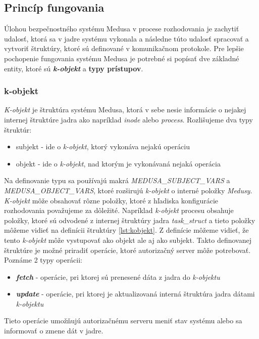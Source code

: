 \subsection{Princíp fungovania}
Úlohou bezpečnostného systému Medusa v procese rozhodovania je zachytiť udalosť, ktorá sa v jadre systému vykonala a následne túto udalosť spracovať a vytvoriť štruktúry, ktoré sú definované v komunikačnom protokole. Pre lepšie pochopenie fungovania systému Medusa je potrebné si popísať dve základné entity, ktoré sú \textbf{\textit{k-objekt}} a \textbf{typy prístupov}.
\subsubsection{k-objekt} \label{kobjekt}
\textit{K-objekt} je štruktúra systému Medusa, ktorá v sebe nesie informácie o nejakej internej štruktúre jadra ako napríklad \textit{inode} alebo \textit{process}. Rozlišujeme dva typy štruktúr:
\begin{itemize}
\item subjekt - ide o \textit{k-objekt}, ktorý vykonáva nejakú operáciu
\item objekt - ide o \textit{k-objekt}, nad ktorým je vykonávaná nejaká operácia
\end{itemize}
Na definovanie typu sa používajú makrá \textit{MEDUSA\_SUBJECT\_VARS} a \textit{MEDUSA\_OBJECT\_VARS}, ktoré rozširujú \textit{k-objekt} o interné položky \textit{Medusy}.\cite{kacer}
\textit{K-objekt} môže obsahovať rôzne položky, ktoré z hľadiska konfigurácie rozhodovania považujeme za dôležité. Napríklad \textit{k-objekt} procesu obsahuje položky, ktoré sú odvodené z internej štruktúry jadra \textit{task\_struct} a tieto položky môžeme vidieť na definícii štruktúry \ref{lst:kobjekt}. Z definície môžeme vidieť, že tento \textit{k-objekt} môže vystupovať ako objekt ale aj ako subjekt. Takto definovanej štruktúre je možné priradiť operácie, ktoré autorizačný server môže potrebovať. Poznáme 2 typy operácii:
\begin{itemize}
\item \textbf{\textit{fetch}} - operácie, pri ktorej sú prenesené dáta z jadra do \textit{k-objektu}
\item \textbf{\textit{update}} - operácie, pri ktorej je aktualizovaná interná štruktúra jadra dátami \textit{k-objektu}
\end{itemize}
Tieto operácie umožňujú autorizačnému serveru meniť stav systému alebo sa informovať o zmene dát v jadre.
